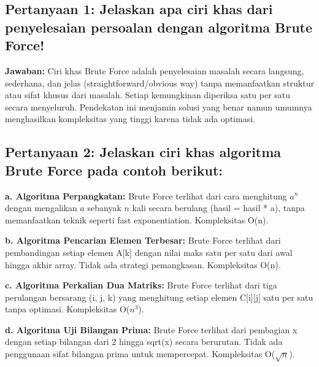\subsection*{Pertanyaan 1: Jelaskan apa ciri khas dari penyelesaian persoalan dengan algoritma Brute Force!}

\textbf{Jawaban:} Ciri khas Brute Force adalah penyelesaian masalah secara langsung, sederhana, dan jelas (straightforward/obvious way) tanpa memanfaatkan struktur atau sifat khusus dari masalah. Setiap kemungkinan diperiksa satu per satu secara menyeluruh. Pendekatan ini menjamin solusi yang benar namun umumnya menghasilkan kompleksitas yang tinggi karena tidak ada optimasi.

\subsection*{Pertanyaan 2: Jelaskan ciri khas algoritma Brute Force pada contoh berikut:}

\textbf{a. Algoritma Perpangkatan:} Brute Force terlihat dari cara menghitung $a^n$ dengan mengalikan $a$ sebanyak $n$ kali secara berulang (hasil = hasil * a), tanpa memanfaatkan teknik seperti fast exponentiation. Kompleksitas O(n).

\textbf{b. Algoritma Pencarian Elemen Terbesar:} Brute Force terlihat dari pembandingan setiap elemen A[k] dengan nilai maks satu per satu dari awal hingga akhir array. Tidak ada strategi pemangkasan. Kompleksitas O(n).

\textbf{c. Algoritma Perkalian Dua Matriks:} Brute Force terlihat dari tiga perulangan bersarang (i, j, k) yang menghitung setiap elemen C[i][j] satu per satu tanpa optimasi. Kompleksitas O($n^3$).

\textbf{d. Algoritma Uji Bilangan Prima:} Brute Force terlihat dari pembagian x dengan setiap bilangan dari 2 hingga sqrt(x) secara berurutan. Tidak ada penggunaan sifat bilangan prima untuk mempercepat. Kompleksitas O($\sqrt{n}$).